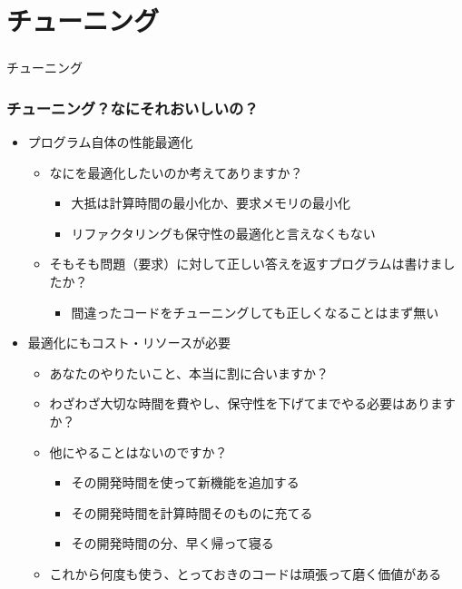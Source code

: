 \section{チューニング}

\begin{frame}
  \frametitle{}
  {\Huge チューニング}
\end{frame}

\begin{frame}
\frametitle{チューニング？なにそれおいしいの？}
\begin{itemize}
  \item プログラム自体の性能最適化
    \begin{itemize}
     \item なにを最適化したいのか考えてありますか？
      \begin{itemize}
        \item 大抵は計算時間の最小化か、要求メモリの最小化
        \item リファクタリングも保守性の最適化と言えなくもない
      \end{itemize}
     \item そもそも問題（要求）に対して正しい答えを返すプログラムは書けましたか？
      \begin{itemize}
        \item 間違ったコードをチューニングしても正しくなることはまず無い
      \end{itemize}
    \end{itemize}
   \item 最適化にもコスト・リソースが必要
    \begin{itemize}
       \item あなたのやりたいこと、本当に割に合いますか？
      \item わざわざ大切な時間を費やし、保守性を下げてまでやる必要はありますか？
       \item 他にやることはないのですか？
        \begin{itemize}
           \item その開発時間を使って新機能を追加する
           \item その開発時間を計算時間そのものに充てる
          \item その開発時間の分、早く帰って寝る
        \end{itemize}
       \item これから何度も使う、とっておきのコードは頑張って磨く価値がある
    \end{itemize}
\end{itemize}
\end{frame}

